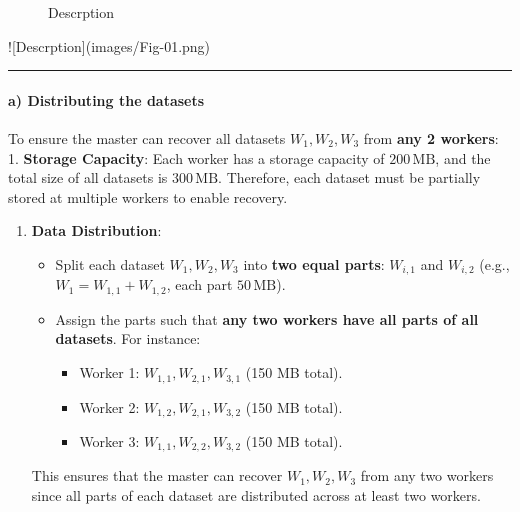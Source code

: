 \documentclass[11pt]{article}
\providecommand{\tightlist}{%
      \setlength{\itemsep}{0pt}\setlength{\parskip}{0pt}}
\begin{document}
\begin{figure}
\centering
{}
\caption{Descrption}
\end{figure}
![Descrption](images/Fig-01.png)
    \begin{center}\rule{0.5\linewidth}{0.5pt}\end{center}

\paragraph{\texorpdfstring{\textbf{a) Distributing the
datasets}}{a) Distributing the datasets}}\label{a-distributing-the-datasets}

To ensure the master can recover all datasets \(W_1, W_2, W_3\) from
\textbf{any 2 workers}: 1. \textbf{Storage Capacity}: Each worker has a
storage capacity of \(200 \, \text{MB}\), and the total size of all
datasets is \(300 \, \text{MB}\). Therefore, each dataset must be
partially stored at multiple workers to enable recovery.

\begin{enumerate}
\def\labelenumi{\arabic{enumi}.}
\setcounter{enumi}{1}
\tightlist
\item
  \textbf{Data Distribution}:

  \begin{itemize}
  \tightlist
  \item
    Split each dataset \(W_1, W_2, W_3\) into \textbf{two equal parts}:
    \(W_{i,1}\) and \(W_{i,2}\) (e.g., \(W_1 = W_{1,1} + W_{1,2}\), each
    part \(50 \, \text{MB}\)).
  \item
    Assign the parts such that \textbf{any two workers have all parts of
    all datasets}. For instance:

    \begin{itemize}
    \tightlist
    \item
      Worker 1: \(W_{1,1}, W_{2,1}, W_{3,1}\) (150 MB total).
    \item
      Worker 2: \(W_{1,2}, W_{2,1}, W_{3,2}\) (150 MB total).
    \item
      Worker 3: \(W_{1,1}, W_{2,2}, W_{3,2}\) (150 MB total).
    \end{itemize}
  \end{itemize}

  This ensures that the master can recover \(W_1, W_2, W_3\) from any
  two workers since all parts of each dataset are distributed across at
  least two workers.
\end{enumerate}
\end{document}

